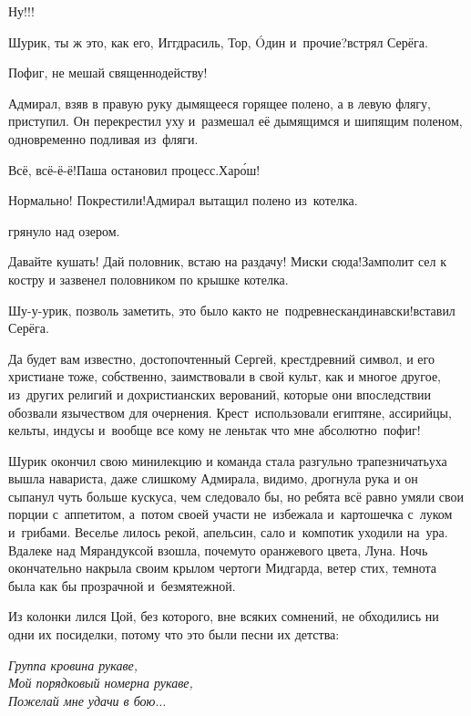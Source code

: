\diagdash Ну!!!

\diagdash Шурик, ты ж это, как его, Иггдрасиль, Тор, {\'{O}}дин и~прочие?\mdash встрял Серёга.

\diagdash Пофиг, не мешай священнодейству!

Адмирал, взяв в правую руку дымящееся горящее полено, а в левую флягу, приступил. Он перекрестил уху и~размешал её дымящимся и шипящим поленом, одновременно подливая из~фляги.

\diagdash Всё, всё-ё-ё!\mdash Паша остановил процесс.\mdash Хар{\'о}ш!

\diagdash Нормально! Покрестили!\mdash Адмирал вытащил полено из~котелка.

\mdash грянуло над озером.

\diagdash Давайте кушать! Дай половник, встаю на раздачу! Миски сюда!\mdash Замполит сел к костру и зазвенел половником по крышке котелка.

\diagdash Шу-у-урик, позволь заметить, это было как\sdash то не~по\sdash древнескандинавски!\mdash вставил Серёга.

\diagdash Да будет вам известно, достопочтенный Сергей, крест\mdash древний символ, и его христиане тоже, собственно, заимствовали в свой культ, как и многое другое, из~других религий и дохристианских верований, которые они впоследствии обозвали язычеством для очернения. Крест~использовали египтяне, ассирийцы, кельты, индусы и~вообще все кому не лень\mdash так что мне абсолютно~пофиг! 

Шурик окончил свою мини\sdash лекцию и команда стала разгульно трапезничать\mdash уха вышла навариста, даже слишком\mdash у Адмирала, видимо, дрогнула рука и он сыпанул чуть больше кус\sdash куса, чем следовало бы, но ребята всё равно умяли свои порции с~аппетитом, а~потом своей участи не~избежала и~картошечка с~луком и~грибами. Веселье лилось рекой, апельсин, сало и~компотик уходили на~ура. Вдалеке над Мярандуксой взошла, почему\sdash то оранжевого цвета, Луна. Ночь окончательно накрыла своим крылом чертоги Мидгарда, ветер стих, темнота была как бы прозрачной и~безмятежной.

Из колонки лился Цой, без которого, вне всяких сомнений, не обходились ни одни их посиделки, потому что это были песни их детства:

\vspace{0.1cm}
\noindent\textit{%
	\hspace*{2.5cm}Группа крови\mdash на рукаве,\\	
	\hspace*{2.5cm}Мой порядковый номер\mdash на рукаве,\\
	\hspace*{2.5cm}Пожелай мне удачи в бою$\ldots$%
}

